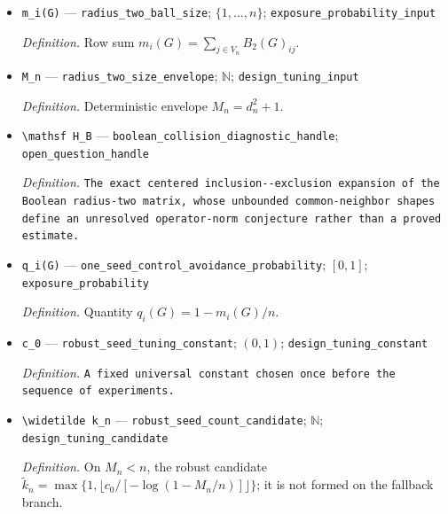 \documentclass{article}
\begin{document}
\begin{itemize}
  \item \texttt{m\_\allowbreak{}i(G)} --- \texttt{radius\_\allowbreak{}two\_\allowbreak{}ball\_\allowbreak{}size}; \(\{1,\ldots,n\}\); \texttt{exposure\_\allowbreak{}probability\_\allowbreak{}input}
  \par\smallskip\noindent\emph{Definition.} Row sum \(m_i(G)=\sum_{j\in V_n}B_2(G)_{ij}\).
  \item \texttt{M\_\allowbreak{}n} --- \texttt{radius\_\allowbreak{}two\_\allowbreak{}size\_\allowbreak{}envelope}; \(\mathbb N\); \texttt{design\_\allowbreak{}tuning\_\allowbreak{}input}
  \par\smallskip\noindent\emph{Definition.} Deterministic envelope \(M_n=d_n^2+1\).
  \item \texttt{\textbackslash{}\allowbreak{}mathsf H\_\allowbreak{}B} --- \texttt{boolean\_\allowbreak{}collision\_\allowbreak{}diagnostic\_\allowbreak{}handle}; \texttt{open\_\allowbreak{}question\_\allowbreak{}handle}
  \par\smallskip\noindent\emph{Definition.} \texttt{The exact centered inclusion-\allowbreak{}-\allowbreak{}exclusion expansion of the Boolean radius-\allowbreak{}two matrix,\allowbreak{} whose unbounded common-\allowbreak{}neighbor shapes define an unresolved operator-\allowbreak{}norm conjecture rather than a proved estimate.}
  \item \texttt{q\_\allowbreak{}i(G)} --- \texttt{one\_\allowbreak{}seed\_\allowbreak{}control\_\allowbreak{}avoidance\_\allowbreak{}probability}; \([0,1]\); \texttt{exposure\_\allowbreak{}probability}
  \par\smallskip\noindent\emph{Definition.} Quantity \(q_i(G)=1-m_i(G)/n\).
  \item \texttt{c\_\allowbreak{}0} --- \texttt{robust\_\allowbreak{}seed\_\allowbreak{}tuning\_\allowbreak{}constant}; \((0,1)\); \texttt{design\_\allowbreak{}tuning\_\allowbreak{}constant}
  \par\smallskip\noindent\emph{Definition.} \texttt{A fixed universal constant chosen once before the sequence of experiments.}
  \item \texttt{\textbackslash{}\allowbreak{}widetilde k\_\allowbreak{}n} --- \texttt{robust\_\allowbreak{}seed\_\allowbreak{}count\_\allowbreak{}candidate}; \(\mathbb N\); \texttt{design\_\allowbreak{}tuning\_\allowbreak{}candidate}
  \par\smallskip\noindent\emph{Definition.} On \(M_n<n\), the robust candidate \(\widetilde k_n=\max\{1,\lfloor c_0/[-\log(1-M_n/n)]\rfloor\}\); it is not formed on the fallback branch.

\end{itemize}
\end{document}
